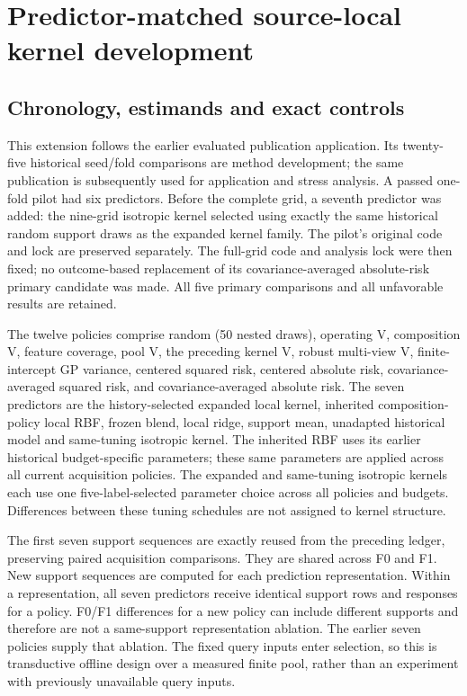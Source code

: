 \section{Predictor-matched source-local kernel development}
\subsection{Chronology, estimands and exact controls}
This extension follows the earlier evaluated publication application. Its twenty-five historical seed/fold comparisons are method development; the same publication is subsequently used for application and stress analysis. A passed one-fold pilot had six predictors. Before the complete grid, a seventh predictor was added: the nine-grid isotropic kernel selected using exactly the same historical random support draws as the expanded kernel family. The pilot's original code and lock are preserved separately. The full-grid code and analysis lock were then fixed; no outcome-based replacement of its covariance-averaged absolute-risk primary candidate was made. All five primary comparisons and all unfavorable results are retained.

The twelve policies comprise random (50 nested draws), operating V, composition V, feature coverage, pool V, the preceding kernel V, robust multi-view V, finite-intercept GP variance, centered squared risk, centered absolute risk, covariance-averaged squared risk, and covariance-averaged absolute risk. The seven predictors are the history-selected expanded local kernel, inherited composition-policy local RBF, frozen blend, local ridge, support mean, unadapted historical model and same-tuning isotropic kernel. The inherited RBF uses its earlier historical budget-specific parameters; these same parameters are applied across all current acquisition policies. The expanded and same-tuning isotropic kernels each use one five-label-selected parameter choice across all policies and budgets. Differences between these tuning schedules are not assigned to kernel structure.

The first seven support sequences are exactly reused from the preceding ledger, preserving paired acquisition comparisons. They are shared across F0 and F1. New support sequences are computed for each prediction representation. Within a representation, all seven predictors receive identical support rows and responses for a policy. F0/F1 differences for a new policy can include different supports and therefore are not a same-support representation ablation. The earlier seven policies supply that ablation. The fixed query inputs enter selection, so this is transductive offline design over a measured finite pool, rather than an experiment with previously unavailable query inputs.

